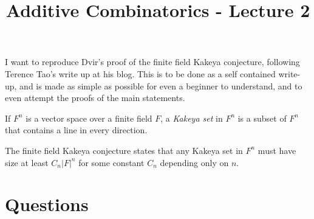\documentclass[12pt]{article}
\title{Additive Combinatorics - Lecture 2}
\author{}
\date{}
\begin{document}
\maketitle

I want to reproduce Dvir's proof of the finite field Kakeya conjecture, following Terence Tao's write up at his blog.
This is to be done as a self contained write-up, and is made as simple as possible for even a beginner to understand, and to even attempt the proofs of the main statements.

If $F^n$ is a vector space over a finite field $F$,
a \textit{Kakeya set} in $F^n$ is a subset of $F^n$
that contains a line in every direction.

The finite field Kakeya conjecture states that
any Kakeya set in $F^n$ must have size at least $C_n |F|^n$ for some constant $C_n$ depending only on $n$.

\section*{Questions}
\end{document}
